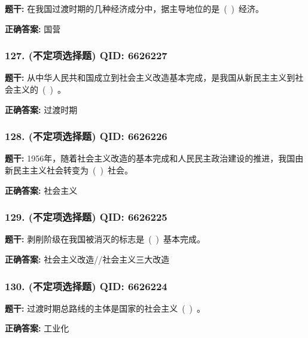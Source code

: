 \documentclass[12pt,UTF8]{ctexart}
\begin{document}
\textbf{题干:}
在我国过渡时期的几种经济成分中，据主导地位的是 ( ) 经济。

\textbf{正确答案:}
国营

\vspace{0.3em}\hrulefill\vspace{0.7em}

\subsubsection*{127. (不定项选择题) \small QID: 6626227}

\textbf{题干:}
从中华人民共和国成立到社会主义改造基本完成，是我国从新民主主义到社会主义的 ( ) 。

\textbf{正确答案:}
过渡时期

\vspace{0.3em}\hrulefill\vspace{0.7em}

\subsubsection*{128. (不定项选择题) \small QID: 6626226}

\textbf{题干:}
1956年，随着社会主义改造的基本完成和人民民主政治建设的推进，我国由新民主主义社会转变为 ( ) 社会。

\textbf{正确答案:}
社会主义

\vspace{0.3em}\hrulefill\vspace{0.7em}

\subsubsection*{129. (不定项选择题) \small QID: 6626225}

\textbf{题干:}
剥削阶级在我国被消灭的标志是 ( ) 基本完成。

\textbf{正确答案:}
社会主义改造//社会主义三大改造

\vspace{0.3em}\hrulefill\vspace{0.7em}

\subsubsection*{130. (不定项选择题) \small QID: 6626224}

\textbf{题干:}
过渡时期总路线的主体是国家的社会主义 ( ) 。

\textbf{正确答案:}
工业化
\end{document}
